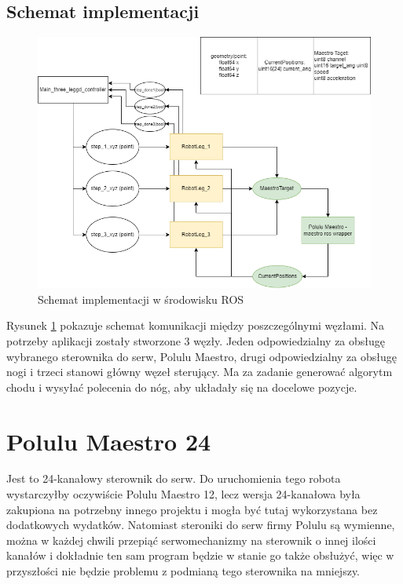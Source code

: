 \subsection{Schemat implementacji}
\begin{figure}[H]
\includegraphics[width=\textwidth]{img/implementation_schematic.png}
\caption{Schemat implementacji w środowisku ROS}
\label{ros_implementation_schematic}
\end{figure}

Rysunek \ref{ros_implementation_schematic} pokazuje schemat komunikacji między poszczególnymi węzłami. Na potrzeby aplikacji zostały stworzone 3 węzły. Jeden odpowiedzialny za obsługę wybranego sterownika do serw, Polulu Maestro, drugi odpowiedzialny za obsługę nogi i trzeci stanowi główny węzeł sterujący. Ma za zadanie generować algorytm chodu i wysyłać polecenia do nóg, aby układały się na docelowe pozycje.
\section{Polulu Maestro 24}
Jest to 24-kanałowy sterownik do serw. Do uruchomienia tego robota wystarczyłby oczywiście Polulu Maestro 12, lecz wersja 24-kanałowa była zakupiona na potrzebny innego projektu i mogła być tutaj wykorzystana bez dodatkowych wydatków. Natomiast steroniki do serw firmy Polulu są wymienne, można w każdej chwili przepiąć serwomechanizmy na sterownik o innej ilości kanałów i dokładnie ten sam program będzie w stanie go także obsłużyć, więc w przyszłości nie będzie problemu z podmianą tego sterownika na mniejszy.\\


